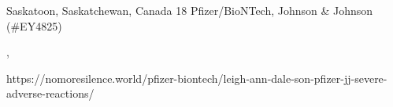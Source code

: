           {
            Saskatoon, Saskatchewan, Canada
          }
          {
            18
          }
          {
            Pfizer/BioNTech, Johnson \& Johnson
          }
          {
             (\#EY4825)
          }
          {
            ,
            
          }
          {
            https://nomoresilence.world/pfizer-biontech/leigh-ann-dale-son-pfizer-jj-severe-adverse-reactions/
          }

